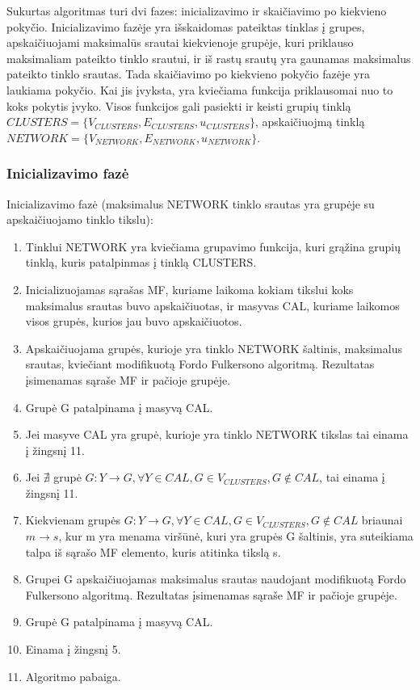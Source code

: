 Sukurtas algoritmas turi dvi fazes: inicializavimo ir skaičiavimo po kiekvieno pokyčio. Inicializavimo fazėje yra  išskaidomas pateiktas tinklas į grupes, apskaičiuojami maksimalūs srautai kiekvienoje grupėje, kuri priklauso maksimaliam pateikto tinklo srautui, ir iš rastų srautų yra gaunamas maksimalus pateikto tinklo srautas. Tada  skaičiavimo po kiekvieno pokyčio fazėje yra laukiama pokyčio. Kai jis įvyksta, yra kviečiama funkcija priklausomai nuo to koks pokytis įvyko. Visos funkcijos gali pasiekti ir keisti grupių tinklą $CLUSTERS=\{V_{CLUSTERS}, E_{CLUSTERS}, u_{CLUSTERS}\}$, apskaičiuojmą tinklą $NETWORK=\{V_{NETWORK}, E_{NETWORK}, u_{NETWORK}\}$.

\subsubsection{Inicializavimo fazė}

Inicializavimo fazė (maksimalus NETWORK tinklo srautas yra grupėje su apskaičiuojamo tinklo tikslu):
\begin{enumerate}
	\item Tinklui NETWORK yra kviečiama grupavimo funkcija, kuri grąžina grupių tinklą, kuris patalpinmas į tinklą CLUSTERS.
	\item Inicializuojamas sąrašas MF, kuriame  laikoma kokiam tikslui koks maksimalus srautas buvo apskaičiuotas, ir masyvas CAL, kuriame laikomos visos grupės, kurios jau buvo apskaičiuotos.
	\item Apskaičiuojama grupės, kurioje yra tinklo NETWORK šaltinis, maksimalus srautas, kviečiant modifikuotą Fordo Fulkersono algoritmą. Rezultatas įsimenamas sąraše MF ir pačioje grupėje.
	\item Grupė G patalpinama į masyvą CAL.
	\item Jei masyve CAL yra grupė, kurioje yra tinklo NETWORK tikslas tai einama į žingsnį 11.
	\item Jei $\nexists$ grupė $G : Y \rightarrow G, \forall Y \in CAL, G \in V_{CLUSTERS}, G \notin CAL$, tai einama į žingsnį 11.
	\item Kiekvienam grupės $G : Y \rightarrow G, \forall Y \in CAL, G \in V_{CLUSTERS}, G \notin CAL$ briaunai $m \rightarrow s$, kur m yra menama viršūnė, kuri yra grupės G šaltinis, yra suteikiama talpa iš sąrašo MF elemento, kuris atitinka tikslą s.
	 \item Grupei G apskaičiuojamas maksimalus srautas naudojant modifikuotą Fordo Fulkersono algoritmą.  Rezultatas įsimenamas sąraše MF ir pačioje grupėje.
	 \item Grupė G patalpinama į masyvą CAL.
	 \item Einama į žingsnį 5. 
	 \item Algoritmo pabaiga. 
\end{enumerate}

